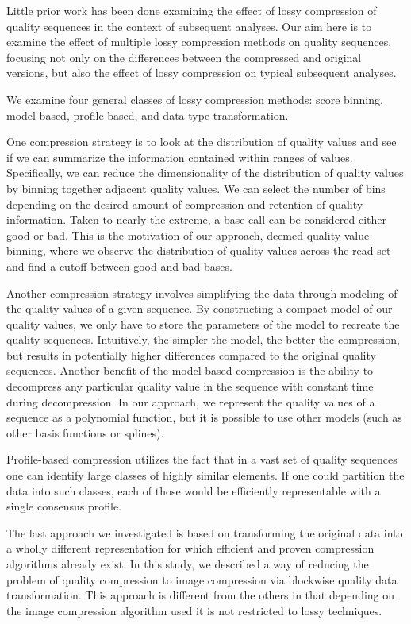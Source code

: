 \documentclass{bioinfo}
\begin{document}
Little prior work has been done examining the effect of lossy compression of quality sequences in the context of subsequent analyses. Our aim here is to examine the effect of multiple lossy compression methods on quality sequences, focusing not only on the differences between the compressed and original versions, but also the effect of lossy compression on typical subsequent analyses.

We examine four general classes of lossy compression methods: score binning, model-based, profile-based, and data type transformation.

One compression strategy is to look at the distribution of quality values and see if we can summarize the information contained within ranges of values. Specifically, we can reduce the dimensionality of the distribution of quality values by binning together adjacent quality values. We can select the number of bins depending on the desired amount of compression and retention of quality information. Taken to nearly the extreme, a base call can be considered either good or bad. This is the motivation of our approach, deemed quality value binning, where we observe the distribution of quality values across the read set and find a cutoff between good and bad bases.

Another compression strategy involves simplifying the data through modeling of the quality values of a given sequence.
By constructing a compact model of our quality values, we only have to store the parameters of the model to recreate the quality sequences.
Intuitively, the simpler the model, the better the compression, but results in potentially higher differences compared to the original quality sequences.
Another benefit of the model-based compression is the ability to decompress any particular quality value in the sequence with constant time during decompression.
In our approach, we represent the quality values of a sequence as a polynomial function, but it is possible to use other models (such as other basis functions or splines).

Profile-based compression utilizes the fact that in a vast set of quality sequences one can identify large classes of highly similar elements. If one could partition the data into such classes, each of those would be efficiently representable with a single consensus profile.

The last approach we investigated is based on transforming the original data into a wholly different representation for which efficient and proven compression algorithms already exist. In this study, we described a way of reducing the problem of quality compression to image compression via blockwise quality data transformation. This approach is different from the others in that depending on the image compression algorithm used it is not restricted to lossy techniques.
\end{document}
